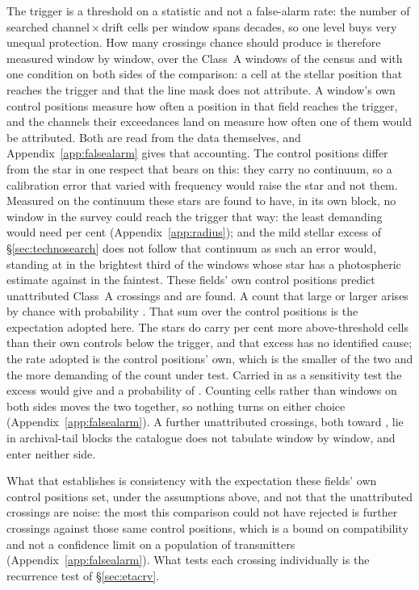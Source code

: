 The trigger is a threshold on a statistic and not a false-alarm rate: the
number of searched channel\,$\times$\,drift cells per window spans
\TuCellsDecades{} decades, so one level buys very unequal protection. How
many crossings chance should produce is therefore measured window by window,
over the \CeNWin{} Class~A windows of the census and with one condition on
both sides of the comparison: a cell at the stellar position that reaches the
trigger and that the line mask does not attribute. A window's own \NCtrl{} control positions measure how often a position in
that field reaches the trigger, and the channels their exceedances land on
measure how often one of them would be attributed. Both are read from the
data themselves, and Appendix~\ref{app:falsealarm} gives that accounting. The control positions differ from the star in one respect that
bears on this: they carry no continuum, so a calibration error that varied
with frequency would raise the star and not them. Measured on the continuum
these stars are found to have, in its own block, no window in the survey
could reach the trigger that way: the least demanding would need
\CyEpsMinPct{} per cent (Appendix~\ref{app:radius}); and the mild stellar
excess of
\S\ref{sec:technosearch} does not follow that continuum as such an error
would, standing at \CkRatioContBright{} in the brightest third of the
\CkNContWin{} windows whose star has a photospheric estimate against
\CkRatioContFaint{} in the faintest. These fields' own control positions predict \CeExp{} unattributed
Class~A crossings and \CeObs{} are found. A count that large or larger arises
by chance with probability \CeProbNull. That sum over the control positions
is the expectation adopted here. The stars do carry \CeStepPct{} per cent
more above-threshold cells than their own controls below the trigger, and
that excess has no identified cause; the rate adopted is the control
positions' own, which is the smaller of the two and the more demanding of
the count under test. Carried in as a sensitivity test the excess would give
\CeExpX{} and a probability of \CeProbStep.
Counting cells rather than windows on both sides moves the two
together, so nothing turns on either choice (Appendix~\ref{app:falsealarm}). A further \CeNTailCrossWord{} unattributed
crossings, both toward \CeTailStar, lie in archival-tail blocks the catalogue
does not tabulate window by window, and enter neither side.

What that establishes is consistency with the expectation these fields' own
control positions set, under the assumptions above, and not that the
unattributed crossings are noise: the most this comparison could not have
rejected is \CeAddLim{} further crossings against those same control
positions, which is a bound on compatibility and not a confidence limit on a
population of transmitters (Appendix~\ref{app:falsealarm}). What tests each
crossing individually is the recurrence test of \S\ref{sec:etacrv}.

